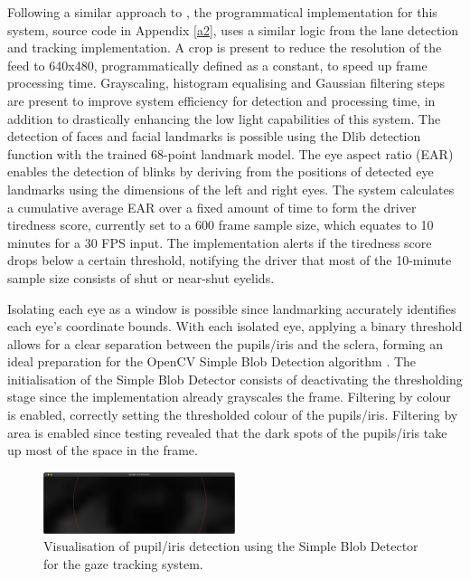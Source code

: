\documentclass[10pt,conference]{IEEEtran}
\begin{document}
Following a similar approach to \cite{b15}, the programmatical implementation for this system, source code in Appendix \ref{a2}, uses a similar logic from the lane detection and tracking implementation. A crop is present to reduce the resolution of the feed to 640x480, programmatically defined as a constant, to speed up frame processing time. Grayscaling, histogram equalising and Gaussian filtering steps are present to improve system efficiency for detection and processing time, in addition to drastically enhancing the low light capabilities of this system. The detection of faces and facial landmarks is possible using the Dlib detection function with the trained 68-point landmark model. The eye aspect ratio (EAR) enables the detection of blinks by deriving from the positions of detected eye landmarks using the dimensions of the left and right eyes. The system calculates a cumulative average EAR over a fixed amount of time to form the driver tiredness score, currently set to a 600 frame sample size, which equates to 10 minutes for a 30 FPS input. The implementation alerts if the tiredness score drops below a certain threshold, notifying the driver that most of the 10-minute sample size consists of shut or near-shut eyelids.

Isolating each eye as a window is possible since landmarking accurately identifies each eye's coordinate bounds. With each isolated eye, applying a binary threshold allows for a clear separation between the pupils/iris and the sclera, forming an ideal preparation for the OpenCV Simple Blob Detection algorithm \cite{b16}. The initialisation of the Simple Blob Detector consists of deactivating the thresholding stage since the implementation already grayscales the frame. Filtering by colour is enabled, correctly setting the thresholded colour of the pupils/iris. Filtering by area is enabled since testing revealed that the dark spots of the pupils/iris take up most of the space in the frame.

\begin{figure}[htbp]
    \centerline{\includegraphics[width=0.5\textwidth]{assets/gaze-detection.png}}
    \caption{Visualisation of pupil/iris detection using the Simple Blob Detector for the gaze tracking system.}
    \label{f6}
\end{figure}
\end{document}
